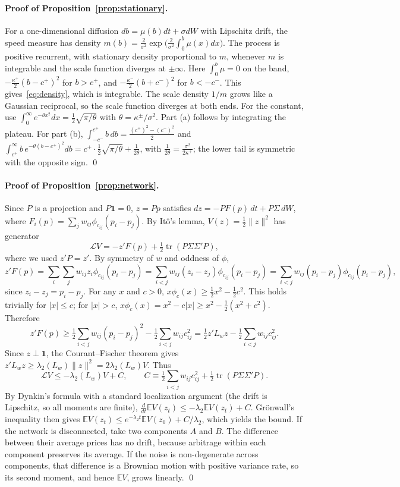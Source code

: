 \documentclass[12pt]{article}
\theoremstyle{definition}
\theoremstyle{remark}
\newcommand{\E}{\mathbb{E}}
\begin{document}
\paragraph{Proof of Proposition~\ref{prop:stationary}.}
For a one-dimensional diffusion $db=\mu(b)dt+\sigma dW$ with Lipschitz drift, the speed measure has density $m(b)=\frac{2}{\sigma^2}\exp\!\big(\frac{2}{\sigma^2}\int_0^b\mu(x)dx\big)$. The process is positive recurrent, with stationary density proportional to $m$, whenever $m$ is integrable and the scale function diverges at $\pm\infty$. Here $\int_0^b\mu=0$ on the band, $-\frac{\kappa^+}{2}(b-c^+)^2$ for $b>c^+$, and $-\frac{\kappa^-}{2}(b+c^-)^2$ for $b<-c^-$. This gives~\eqref{eq:density}, which is integrable. The scale density $1/m$ grows like a Gaussian reciprocal, so the scale function diverges at both ends. For the constant, use $\int_0^\infty e^{-\theta x^2}dx=\frac12\sqrt{\pi/\theta}$ with $\theta=\kappa^\pm/\sigma^2$. Part (a) follows by integrating the plateau. For part (b), $\int_{-c^-}^{c^+}b\,db=\frac{(c^+)^2-(c^-)^2}{2}$ and $\int_{c^+}^\infty b\,e^{-\theta(b-c^+)^2}db=c^+\cdot\frac12\sqrt{\pi/\theta}+\frac{1}{2\theta}$, with $\frac{1}{2\theta}=\frac{\sigma^2}{2\kappa^+}$; the lower tail is symmetric with the opposite sign. \qed

\paragraph{Proof of Proposition~\ref{prop:network}.}
Since $P$ is a projection and $P\mathbf 1=0$, $z=Pp$ satisfies $dz=-P F(p)\,dt+P\Sigma\,dW$, where $F_i(p)=\sum_jw_{ij}\phi_{c_{ij}}(p_i-p_j)$. By Itô's lemma, $V(z)=\frac12\|z\|^2$ has generator
\[
\mathcal LV = -z'F(p)+\tfrac12\operatorname{tr}(P\Sigma\Sigma'P),
\]
where we used $z'P=z'$. By symmetry of $w$ and oddness of $\phi$,
\[
z'F(p)=\sum_i\sum_jw_{ij}z_i\phi_{c_{ij}}(p_i-p_j)=\sum_{i<j}w_{ij}(z_i-z_j)\phi_{c_{ij}}(p_i-p_j)=\sum_{i<j}w_{ij}(p_i-p_j)\phi_{c_{ij}}(p_i-p_j),
\]
since $z_i-z_j=p_i-p_j$. For any $x$ and $c>0$, $x\phi_c(x)\ge\frac12x^2-\frac12c^2$. This holds trivially for $|x|\le c$; for $|x|>c$, $x\phi_c(x)=x^2-c|x|\ge x^2-\frac12(x^2+c^2)$. Therefore
\[
z'F(p)\ge\tfrac12\sum_{i<j}w_{ij}(p_i-p_j)^2-\tfrac12\sum_{i<j}w_{ij}c_{ij}^2=\tfrac12z'L_wz-\tfrac12\sum_{i<j}w_{ij}c_{ij}^2 .
\]
Since $z\perp\mathbf 1$, the Courant--Fischer theorem gives $z'L_wz\ge\lambda_2(L_w)\|z\|^2=2\lambda_2(L_w)V$. Thus
\[
\mathcal LV\le-\lambda_2(L_w)V+C,\qquad C\equiv\tfrac12\sum_{i<j}w_{ij}c_{ij}^2+\tfrac12\operatorname{tr}(P\Sigma\Sigma'P).
\]
By Dynkin's formula with a standard localization argument (the drift is Lipschitz, so all moments are finite), $\frac{d}{dt}\E V(z_t)\le-\lambda_2\E V(z_t)+C$. Gr\"onwall's inequality then gives $\E V(z_t)\le e^{-\lambda_2t}\E V(z_0)+C/\lambda_2$, which yields the bound. If the network is disconnected, take two components $A$ and $B$. The difference between their average prices has no drift, because arbitrage within each component preserves its average. If the noise is non-degenerate across components, that difference is a Brownian motion with positive variance rate, so its second moment, and hence $\E V$, grows linearly. \qed
\end{document}
